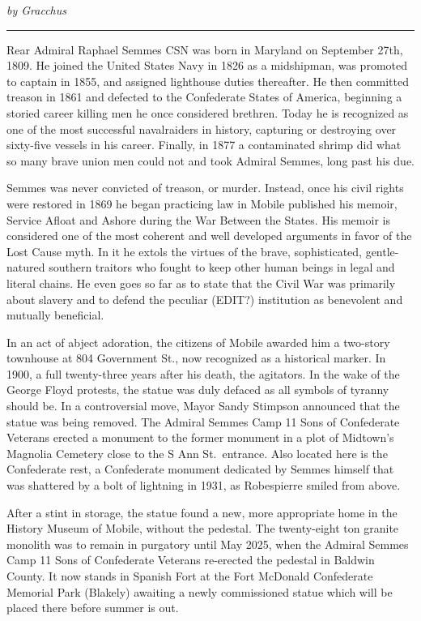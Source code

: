 \documentclass[
]{book}
\begin{document}
\emph{by Gracchus}

\begin{center}\rule{0.5\linewidth}{0.5pt}\end{center}

Rear Admiral Raphael Semmes CSN was born in Maryland on September 27th, 1809. He joined the United States Navy in 1826 as a midshipman, was promoted to captain in 1855, and assigned lighthouse duties thereafter. He then committed treason in 1861 and defected to the Confederate States of America, beginning a storied career killing men he once considered brethren. Today he is recognized as one of the most successful navalraiders in history, capturing or destroying over sixty-five vessels in his career. Finally, in 1877 a contaminated shrimp did what so many brave union men could not and took Admiral Semmes, long past his due.

Semmes was never convicted of treason, or murder. Instead, once his civil rights were restored in 1869 he began practicing law in Mobile published his memoir, Service Afloat and Ashore during the War Between the States. His memoir is considered one of the most coherent and well developed arguments in favor of the Lost Cause myth. In it he extols the virtues of the brave, sophisticated, gentle-natured southern traitors who fought to keep other human beings in legal and literal chains. He even goes so far as to state that the Civil War was primarily about slavery and to defend the peculiar (EDIT?) institution as benevolent and mutually beneficial.

In an act of abject adoration, the citizens of Mobile awarded him a two-story townhouse at 804 Government St., now recognized as a historical marker. In 1900, a full twenty-three years after his death, the agitators. In the wake of the George Floyd protests, the statue was duly defaced as all symbols of tyranny should be. In a controversial move, Mayor Sandy Stimpson announced that the statue was being removed. The Admiral Semmes Camp 11 Sons of Confederate Veterans erected a monument to the former monument in a plot of Midtown's Magnolia Cemetery close to the S Ann St.~entrance. Also located here is the Confederate rest, a Confederate monument dedicated by Semmes himself that was shattered by a bolt of lightning in 1931, as Robespierre smiled from above.

After a stint in storage, the statue found a new, more appropriate home in the History Museum of Mobile, without the pedestal. The twenty-eight ton granite monolith was to remain in purgatory until May 2025, when the Admiral Semmes Camp 11 Sons of Confederate Veterans re-erected the pedestal in Baldwin County. It now stands in Spanish Fort at the Fort McDonald Confederate Memorial Park (Blakely) awaiting a newly commissioned statue which will be placed there before summer is out.
\end{document}
